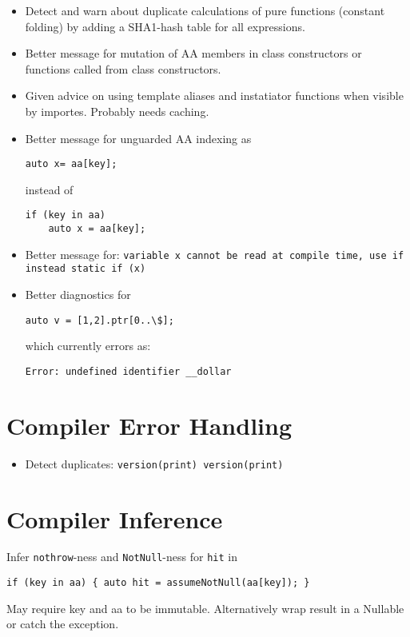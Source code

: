 \documentclass[xcolor=dvipsnames, twocolumn]{article}
\begin{document}
\begin{itemize}
\item Detect and warn about duplicate calculations of pure functions (constant
  folding) by adding a SHA1-hash table for all expressions.
\item Better message for mutation of AA members in class constructors or
  functions called from class constructors.

\item Given advice on using template aliases and instatiator functions when
  visible by importes. Probably needs caching.

\item Better message for unguarded AA indexing as
\begin{lstlisting}[frame=single]
auto x= aa[key];
\end{lstlisting}
instead of
\begin{lstlisting}[frame=single]
if (key in aa)
    auto x = aa[key];
\end{lstlisting}

\item Better message for:
\texttt{variable x cannot be read at compile time, use if instead static if (x)}

\item Better diagnostics for
\begin{lstlisting}[frame=single]
auto v = [1,2].ptr[0..\$];
\end{lstlisting}
which currently errors as:
\begin{lstlisting}[frame=single]
Error: undefined identifier __dollar
\end{lstlisting}

\end{itemize}

\section{Compiler Error Handling}

\begin{itemize}
\item Detect duplicates: \texttt{version(print) version(print)}
\end{itemize}

\section{Compiler Inference}

\item Infer \texttt{nothrow}-ness and \texttt{NotNull}-ness for \texttt{hit} in
\begin{lstlisting}[frame=single]
if (key in aa) { auto hit = assumeNotNull(aa[key]); }
\end{lstlisting}
May require key and aa to be immutable. Alternatively wrap result in a Nullable
or catch the exception.
\end{document}
